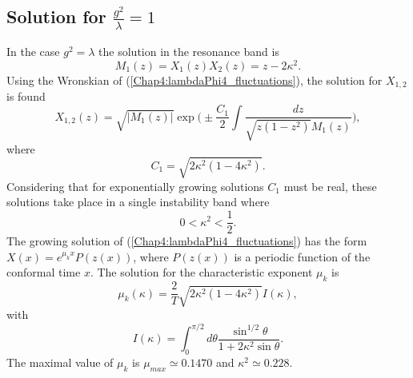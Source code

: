 \documentclass[11pt,a4paper,twoside]{book}
\begin{document}
\subsection*{Solution for $ \frac{g^{2}}{\lambda}=1 $}
In the case $ g^{2}=\lambda $  the solution in the resonance band is 
\begin{equation}
\label{Chap4:lambdaPhi4_solution
Mz1}
M_{1}(z) = X_{1}(z)X_{2}(z) = z-2\kappa^{2}.
\end{equation}
Using the Wronskian of (\ref{Chap4:lambdaPhi4_fluctuations}), the solution for $ X_{1,2} $ is found
\begin{equation}
\label{Chap4:lambdaPhi4_fisrstSolution}
X_{1,2}(z)=\sqrt{|M_{1}(z)|}\exp\Bigg(\pm \frac{C_{1}}{2}\int \frac{dz}{\sqrt{z(1-z^{2})} M_{1}(z)}\Bigg),
\end{equation}
where
\begin{equation}
\label{Chap4:lambdaPhi4_C1}
C_{1}=\sqrt{2\kappa^{2}(1-4\kappa^{2})}.
\end{equation}
Considering that for exponentially growing solutions $ C_{1} $ must be real, these solutions take place in a single instability band where
\begin{equation}
\label{Chap4:lambdaPhi4_bandSolution1}
0 < \kappa^{2} < \frac{1}{2}.
\end{equation}
The growing solution of (\ref{Chap4:lambdaPhi4_fluctuations}) has the form $ X(x) = e^{\mu_{k} x}P(z(x)) $, where $ P(z(x)) $ is a periodic function of the conformal time $ x $. The solution for the characteristic exponent $ \mu_{k} $ is
\begin{equation}
\label{Chap4:lambdaPhi4_rateSolution1}
\mu_{k}(\kappa)=\frac{2}{T}\sqrt{2\kappa^{2}(1-4\kappa^{2})}I(\kappa),
\end{equation}
with
\begin{equation}
\label{Chap4:lambdaPhi4_auxiliaryFunction}
I(\kappa)=\int_{0}^{\pi/2} d\theta \frac{\sin^{1/2}\theta}{1+2\kappa^{2}\sin \theta}.
\end{equation}
The maximal value of $ \mu_{k} $ is $\mu_{max} \simeq 0.1470$ and $\kappa^{2}\simeq 0.228$.
\end{document}

